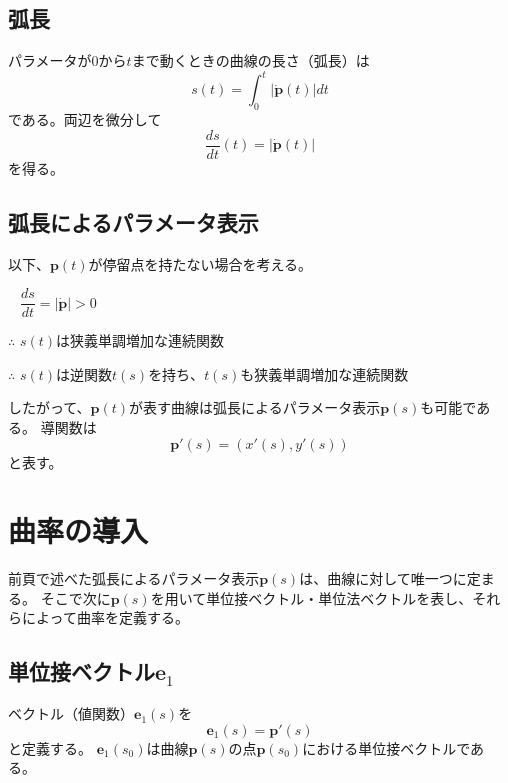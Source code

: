 \documentclass[a4j,disablejfam,dvipdfmx,papersize,slide,uplatex,21pt]{jsarticle}
\begin{document}
\newpage
\subsection*{弧長}
パラメータが$0$から$t$まで動くときの曲線の長さ（弧長）は
\begin{equation}
    s(t) = \int_0^t |\dot{\bm{p}}(t)| dt
\end{equation}
である。両辺を微分して
\begin{equation}
    \frac{ds}{dt}(t) = |\dot{\bm{p}}(t)|
\end{equation}
を得る。

\newpage
\subsection*{弧長によるパラメータ表示}
以下、$\bm{p}(t)$が停留点を持たない場合を考える。

$\phantom{\therefore}$ $\dfrac{ds}{dt} = |\dot{\bm{p}}| > 0$

$\therefore$ $s(t)$は狭義単調増加な連続関数

$\therefore$ $s(t)$は逆関数$t(s)$を持ち、$t(s)$も狭義単調増加な連続関数

\vspace{1em}

したがって、$\bm{p}(t)$が表す曲線は弧長によるパラメータ表示$\bm{p}(s)$も可能である。
導関数は
\begin{equation}
    \bm{p}'(s) = (x'(s), y'(s))
\end{equation}
と表す。



\section{曲率の導入}
前頁で述べた弧長によるパラメータ表示$\bm{p}(s)$は、曲線に対して唯一つに定まる。
そこで次に$\bm{p}(s)$を用いて単位接ベクトル・単位法ベクトルを表し、それらによって曲率を定義する。

\newpage
\subsection*{単位接ベクトル$\bm{e}_1$}
ベクトル（値関数）$\bm{e}_1(s)$を
\begin{equation}
    \bm{e}_1(s) = \bm{p}'(s)
\end{equation}
と定義する。
$\bm{e}_1(s_0)$は曲線$\bm{p}(s)$の点$\bm{p}(s_0)$における単位接ベクトルである。

\newpage
\end{document}
